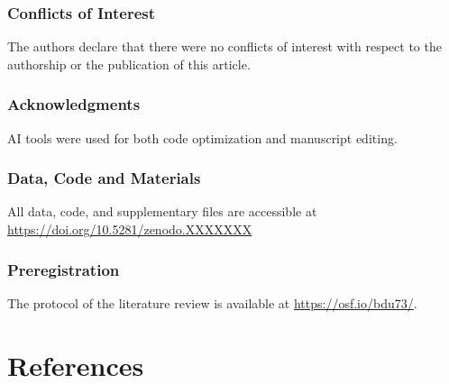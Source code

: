 \documentclass[
  man,
  floatsintext,
  longtable,
  nolmodern,
  notxfonts,
  notimes,
  colorlinks=true,linkcolor=blue,citecolor=blue,urlcolor=blue]{apa7}
\begin{document}
\subsubsection{Conflicts of Interest}\label{conflicts-of-interest}

The authors declare that there were no conflicts of interest with
respect to the authorship or the publication of this article.

\subsubsection{Acknowledgments}\label{acknowledgments}

AI tools were used for both code optimization and manuscript editing.

\subsubsection{Data, Code and Materials}\label{data-code-and-materials}

All data, code, and supplementary files are accessible at
\url{https://doi.org/10.5281/zenodo.XXXXXXX}

\subsubsection{Preregistration}\label{preregistration}

The protocol of the literature review is available at
\url{https://osf.io/bdu73/}.

\section{References}\label{references}
\end{document}
